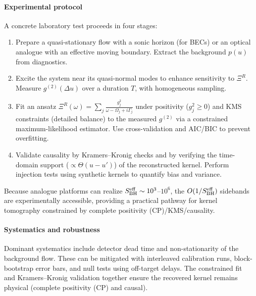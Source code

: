 \documentclass[a4paper,11pt]{article}
\theoremstyle{plain}
\theoremstyle{definition}
\theoremstyle{remark}
\begin{document}
\paragraph{Experimental protocol}
A concrete laboratory test proceeds in four stages:
\begin{enumerate}
  \item Prepare a quasi-stationary flow with a sonic horizon (for BECs) or an optical analogue with an effective moving boundary. Extract the background $p(u)$ from diagnostics.
  \item Excite the system near its quasi-normal modes to enhance sensitivity to $\Xi^R$. Measure $g^{(2)}(\Delta u)$ over a duration $T$, with homogeneous sampling.
  \item Fit an ansatz $\Xi^R(\omega)=\sum_j \frac{g_j^2}{\omega-\Omega_j+i\Gamma_j}$ under positivity ($g_j^2\ge 0$) and KMS constraints (detailed balance) to the measured $g^{(2)}$ via a constrained maximum-likelihood estimator. Use cross-validation and AIC/BIC to prevent overfitting.
  \item Validate causality by Kramers--Kronig checks and by verifying the time-domain support ($\propto \Theta(u-u')$) of the reconstructed kernel. Perform injection tests using synthetic kernels to quantify bias and variance.
\end{enumerate}
Because analogue platforms can realize $S_{\rm BH}^{\rm eff}\sim 10^3$--$10^6$, the $O(1/S_{\rm BH}^{\rm eff})$ sidebands are experimentally accessible, providing a practical pathway for kernel tomography constrained by complete positivity (CP)/KMS/causality.

\paragraph{Systematics and robustness}
Dominant systematics include detector dead time and non-stationarity of the background flow. These can be mitigated with interleaved calibration runs, block-bootstrap error bars, and null tests using off-target delays. The constrained fit and Kramers--Kronig validation together ensure the recovered kernel remains physical (complete positivity (CP) and causal).
\end{document}
